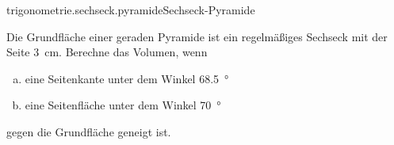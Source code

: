 \begin{exercise}{trigonometrie.sechseck.pyramide}{Sechseck-Pyramide}
  \ifproblem\problem\par
    Die Grundfläche einer geraden Pyramide ist ein regelmäßiges
    Sechseck mit der Seite \SI{3}{\centi\metre}. Berechne das
    Volumen, wenn
    \begin{enumerate}[a)]
      \item eine Seitenkante unter dem Winkel \SI{68.5}{\degree}
      \item eine Seitenfläche unter dem Winkel \SI{70}{\degree}
    \end{enumerate}
    gegen die Grundfläche geneigt ist.
  \fi
\end{exercise}
